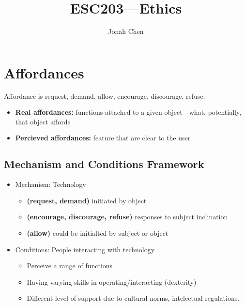 \documentclass[a4paper]{article}
\title{ESC203---Ethics}
\author{Jonah Chen}
\numberwithin{equation}{section}
\begin{document}
\maketitle
\tableofcontents

\section{Affordances}

Affordance is request, demand, allow, encourage, discourage, refuse.

\begin{itemize}
    \item \textbf{Real affordances:} functions attached to a given object---what, potentially, that object affords
    \item \textbf{Percieved affordances:} feature that are clear to the user
\end{itemize}

\subsection{Mechanism and Conditions Framework}
\begin{itemize}
    \item Mechanism: Technology
    \begin{itemize}
        \item \textbf{(request, demand)} initiated by object
        \item \textbf{(encourage, discourage, refuse)} responses to subject inclination
        \item \textbf{(allow)} could be initialted by subject or object
    \end{itemize} 
    \item Conditions: People interacting with technology
    \begin{itemize}
        \item Perceive a range of functions
        \item Having varying skills in operating/interacting (dexterity)
        \item Different level of support due to cultural norms, intelectual regulations.
    \end{itemize}
\end{itemize}
\end{document}
